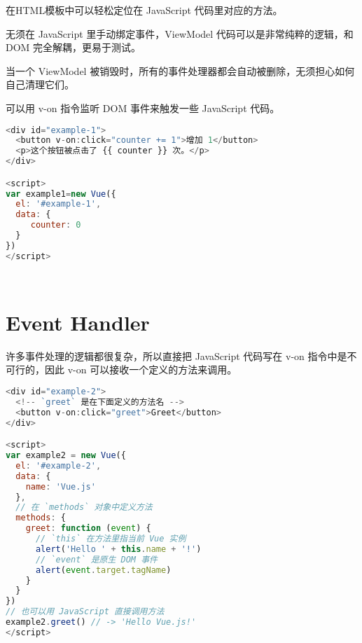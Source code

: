 \begin{compactitem}
\item 在HTML模板中可以轻松定位在 JavaScript 代码里对应的方法。

\item 无须在 JavaScript 里手动绑定事件，ViewModel 代码可以是非常纯粹的逻辑，和 DOM 完全解耦，更易于测试。
\item 当一个 ViewModel 被销毁时，所有的事件处理器都会自动被删除，无须担心如何自己清理它们。
\end{compactitem}

可以用 v-on 指令监听 DOM 事件来触发一些 JavaScript 代码。


\begin{lstlisting}[language=JavaScript]
<div id="example-1">
  <button v-on:click="counter += 1">增加 1</button>
  <p>这个按钮被点击了 {{ counter }} 次。</p>
</div>

<script>
var example1=new Vue({
  el: '#example-1',
  data: {
     counter: 0
  }
})
</script>
\end{lstlisting}



\begin{lstlisting}[language=JavaScript]

\end{lstlisting}



\begin{lstlisting}[language=JavaScript]

\end{lstlisting}

\section{Event Handler}

许多事件处理的逻辑都很复杂，所以直接把 JavaScript 代码写在 v-on 指令中是不可行的，因此 v-on 可以接收一个定义的方法来调用。

\begin{lstlisting}[language=JavaScript]
<div id="example-2">
  <!-- `greet` 是在下面定义的方法名 -->
  <button v-on:click="greet">Greet</button>
</div>

<script>
var example2 = new Vue({
  el: '#example-2',
  data: {
    name: 'Vue.js'
  },
  // 在 `methods` 对象中定义方法
  methods: {
    greet: function (event) {
      // `this` 在方法里指当前 Vue 实例
      alert('Hello ' + this.name + '!')
      // `event` 是原生 DOM 事件
      alert(event.target.tagName)
    }
  }
})
// 也可以用 JavaScript 直接调用方法
example2.greet() // -> 'Hello Vue.js!'
</script>
\end{lstlisting}



